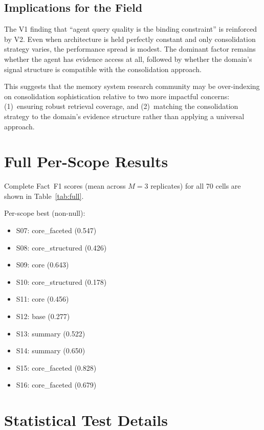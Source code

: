 \documentclass[11pt,a4paper]{article}
\begin{document}
\subsection{Implications for the Field}

The V1 finding that ``agent query quality is the binding constraint'' is reinforced by V2. Even when architecture is held perfectly constant and only consolidation strategy varies, the performance spread is modest. The dominant factor remains whether the agent has evidence access at all, followed by whether the domain's signal structure is compatible with the consolidation approach.

This suggests that the memory system research community may be over-indexing on consolidation sophistication relative to two more impactful concerns: (1)~ensuring robust retrieval coverage, and (2)~matching the consolidation strategy to the domain's evidence structure rather than applying a universal approach.

\appendix

\section{Full Per-Scope Results}

Complete Fact~F1 scores (mean across $M{=}3$ replicates) for all 70 cells are shown in Table~\ref{tab:full}.

Per-scope best (non-null):
\begin{itemize}[nosep]
    \item S07: core\_faceted (0.547)
    \item S08: core\_structured (0.426)
    \item S09: core (0.643)
    \item S10: core\_structured (0.178)
    \item S11: core (0.456)
    \item S12: base (0.277)
    \item S13: summary (0.522)
    \item S14: summary (0.650)
    \item S15: core\_faceted (0.828)
    \item S16: core\_faceted (0.679)
\end{itemize}

\section{Statistical Test Details}
\end{document}
